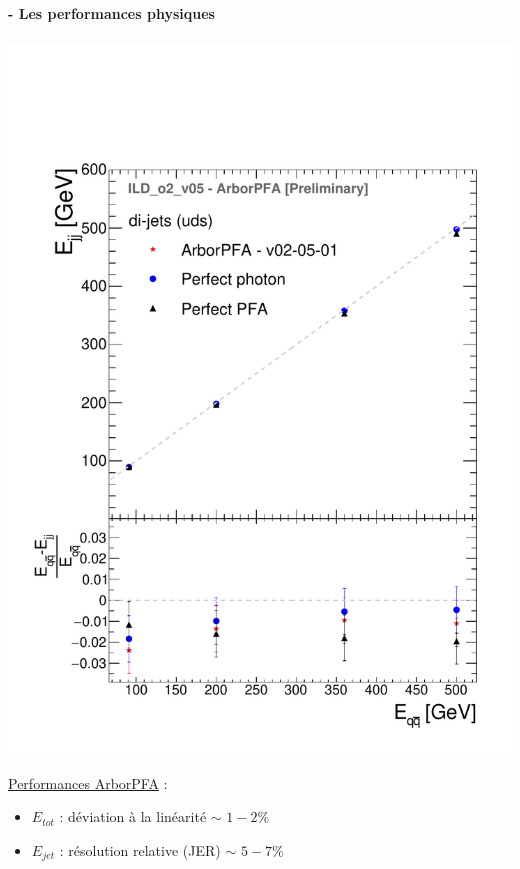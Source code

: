 \documentclass[8pt]{beamer}
\begin{document}
  \begin{frame}
  \frametitle{\secname}
  \framesubtitle{\subsecname - Les performances physiques}
    \begin{minipage}{0.49\linewidth}
      \begin{center}
        \includegraphics[width=\linewidth]{ILDArborPFA_ErecConfusions_NoNeutralHadron.pdf}
      \end{center}
    \end{minipage}
    \begin{minipage}{0.49\linewidth}
      \underline{Performances ArborPFA} :
      \begin{itemize}
        \item \textbf{$E_{tot}$} : déviation à la linéarité $\sim$ $1-2\%$
        \item \textbf{$E_{jet}$} : résolution relative (JER) $\sim$ $5-7\%$
      \end{itemize}

\end{minipage}
\end{frame}
\end{document}
